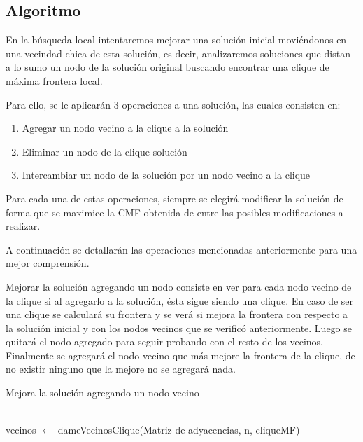 \subsection{Algoritmo}
En la búsqueda local intentaremos mejorar una solución inicial moviéndonos en una vecindad chica de esta solución, es decir, analizaremos soluciones que distan a lo sumo un nodo de la solución original buscando encontrar una clique de máxima frontera local.

Para ello, se le aplicarán 3 operaciones a una solución, las cuales consisten en:

\begin{enumerate}
\item Agregar un nodo vecino a la clique a la solución 
\item Eliminar un nodo de la clique solución
\item Intercambiar un nodo de la solución por un nodo vecino a la clique
\end{enumerate}

Para cada una de estas operaciones, siempre se elegirá modificar la solución de forma que se maximice la CMF obtenida de entre las posibles modificaciones a realizar.

A continuación se detallarán las operaciones mencionadas anteriormente para una mejor comprensión.

Mejorar la solución agregando un nodo consiste en ver para cada nodo vecino de la clique si al agregarlo a la solución, ésta sigue siendo una clique. En caso de ser una clique se calculará su frontera y se verá si mejora la frontera con respecto a la solución inicial y con los nodos vecinos que se verificó anteriormente. Luego se quitará el nodo agregado para seguir probando con el resto de los vecinos. Finalmente se agregará el nodo vecino que más mejore la frontera de la clique, de no existir ninguno que la mejore no se agregará nada.

\begin{algorithm}[H]
\begin{algorithmic}
\caption{Mejora la solución agregando un nodo vecino}
		\State{}\\
		vecinos $\leftarrow$ dameVecinosClique(Matriz de adyacencias, n, cliqueMF)\\
	\EndFunction
\end{algorithmic}
\end{algorithm}


